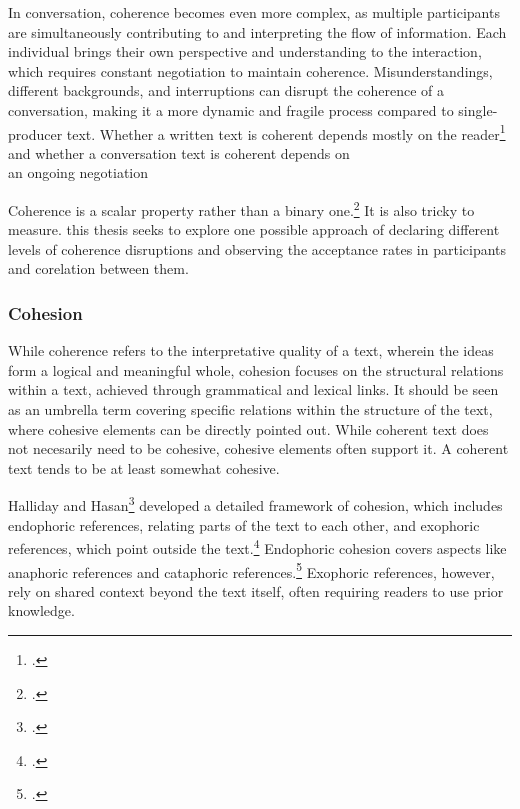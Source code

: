 \documentclass[12pt]{report}
\begin{document}
{\par
    In conversation, coherence becomes even more complex,
    as multiple participants are simultaneously contributing to and interpreting the flow of information.
    Each individual brings their own perspective and understanding to the interaction,
    which requires constant negotiation to maintain coherence.
    Misunderstandings, different backgrounds, and interruptions
    can disrupt the coherence of a conversation,
    making it a more dynamic and fragile process compared to single-producer text.
Whether a written text is coherent depends mostly on the reader\footcite{bublitz1999disturbed,Roberts01101993}
and whether a conversation text is coherent depends on\\ an ongoing negotiation


\par
    Coherence is a scalar property rather than a binary one.\footcite{givón2020coherence}
    It is also tricky to measure.
    this thesis seeks to explore one possible approach of
    declaring different levels of coherence disruptions
    and observing the acceptance rates in participants
    and corelation between them.

\subsubsection{Cohesion}
\par
    While coherence refers to the interpretative quality of a text,
    wherein the ideas form a logical and meaningful whole,
    cohesion focuses on the structural relations
    within a text, achieved through grammatical and lexical links.
    It should be seen as an umbrella term
    covering specific relations within
    the structure of the text,
    where cohesive elements can be directly pointed out.
    While coherent text does not necesarily need to be cohesive,
    cohesive elements often support it.
    A coherent text tends to be at least somewhat cohesive.

\par
    Halliday and Hasan\footcite{Halliday76cohesion} developed
    a detailed framework of cohesion, which includes
    endophoric references,
    relating parts of the text to each other, and
    exophoric references, which point outside the text.\footcite[p.~31]{Halliday76cohesion}
    Endophoric cohesion covers aspects
    like anaphoric references and cataphoric references.\footcite{hajicovasgall2003, loaiciga-etal-2022-anaphoric}
    Exophoric references, however, rely on shared context beyond the text itself,
    often requiring readers to use prior knowledge.

}
\end{document}
